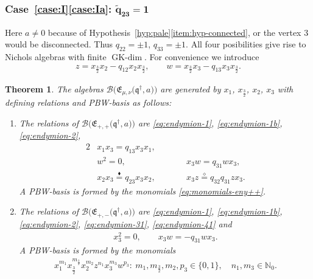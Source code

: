 \documentclass[pdftex]{sigma}
\numberwithin{equation}{section}
\newtheorem{Theorem}{Theorem}[section]
\newcommand{\GK}{\operatorname{GK-dim}}
\newcommand{\toba}{\mathscr B}
\newcommand{\N}{{\mathbb N}}
\newcommand{\eny}{\mathfrak{E}}
\newcommand{\bq}{\mathfrak{q}}
\newcommand{\bqs}{\bq^{\dagger}}
\newcommand{\tresdos}{\frac{3}{2}}
\begin{document}
\subsubsection[Case (I)(a): widetilde\{q\}\_\{23\} = 1]{Case~\ref{case:I}\ref{case:Ia}: $\boldsymbol{\widetilde{q}_{23} = 1}$}

Here $a\neq 0$ because of Hypothesis~\ref{hyp:pale}\ref{item:hyp-connected}, or the vertex 3 would be disconnected.
Thus $q_{22} = \pm 1$, $q_{33} = \pm 1$. All four posibilities give rise to Nichols algebras with finite $\GK$.
For convenience we introduce
\begin{align*}
z = x_{\tresdos}x_2 - q _{12} x_2x_{\tresdos},\qquad
w = x_{\tresdos}x_3 - q _{13} x_3x_{\tresdos}.
\end{align*}


\begin{Theorem} \label{th:endymion-rank4-1}
The algebras $\toba\big(\eny_{\mu, \nu}\big(\bqs, a\big)\big)$ are generated by $x_1$, $x_{\tresdos}$, $x_2$, $x_3$ with defining relations and PBW-basis as follows:
\begin{enumerate}[label=$(\alph*)$]\itemsep=0pt
\item The relations of $\toba\big(\eny_{+, +}\big(\bqs, a\big)\big)$ are
\eqref{eq:endymion-1}, \eqref{eq:endymion-1b}, \eqref{eq:endymion-2},
\begin{alignat}{2}\label{eq:endymion-31}
&x_1x_3 = q_{13}x_3x_1,&&
\\ \label{eq:endymion-31b}
&w^2 =0,&&x_3w = q_{31} wx_3,
\\ \label{eq:endymion-41}
&x_2 x_3 \overset{\blacklozenge}{=} q_{23} x_3x_2,\qquad &&
 x_3z \overset{\diamond}{=} q_{32}q_{31} z x_3.
\end{alignat}
A PBW-basis is formed by the monomials \eqref{eq:monomials-eny++}.

\item The relations of $\toba\big(\eny_{+, -}\big(\bqs, a\big)\big)$ are
\eqref{eq:endymion-1}, \eqref{eq:endymion-1b}, \eqref{eq:endymion-2}, \eqref{eq:endymion-31}, \eqref{eq:endymion-41} and
\begin{align}
\label{eq:endymion-32}
x_3 ^2=0, \qquad x_3 w = -q_{31} w x_3.
\end{align}
A PBW-basis is formed by the monomials
\begin{align*}
x_1^{m_1} x_{\tresdos}^{m_{\tresdos}} x_2^{m_2}z^{n_{1}}x_{3}^{m_{3}}w^{p_{3}}\colon\
m_1, m_{\tresdos}, m_2, p_{3} \in \{0,1\}, \quad n_1, m_3 \in\N_0.
\end{align*}


\end{enumerate}
\end{Theorem}
\end{document}
